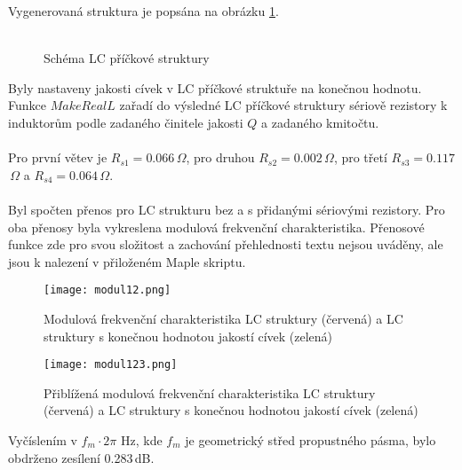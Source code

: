 \noindent Vygenerovaná struktura je popsána na obrázku \ref{s:SCHEM}.\\
\\
\begin{figure}[h]
\centering
{}
\caption{Schéma LC příčkové struktury \label{s:SCHEM}}
\end{figure}
\noindent Byly nastaveny jakosti cívek v LC příčkové struktuře na konečnou hodnotu. Funkce $MakeRealL$ zařadí do výsledné LC příčkové struktury sériově rezistory k induktorům podle zadaného činitele jakosti $Q$ a zadaného kmitočtu.\\
\\
Pro první větev je $R_{s1} = 0.066$\,$\Omega$, pro druhou $R_{s2} = 0.002$\,$\Omega$, pro třetí $R_{s3} = 0.117$\,$\Omega$ a $R_{s4} = 0.064$\,$\Omega$.\\
\\
\noindent Byl spočten přenos pro LC strukturu bez a s přidanými sériovými rezistory. Pro oba přenosy byla vykreslena modulová frekvenční charakteristika. Přenosové funkce zde pro svou složitost a zachování přehlednosti textu nejsou uváděny, ale jsou k nalezení v přiloženém Maple skriptu.
\begin{figure}[h]
\centering
\texttt{[image: modul12.png]}
\caption[Modulová frekvenční charakteristika LC struktury a LC struktury s konečnou hodnotou jakostí cívek]{Modulová frekvenční charakteristika LC struktury (červená) a LC struktury s konečnou hodnotou jakostí cívek (zelená)}
\end{figure}
\begin{figure}[h]
\centering
\texttt{[image: modul123.png]}
\caption[Přiblížená modulová frekvenční charakteristika LC struktury a LC struktury s konečnou hodnotou jakostí cívek]{Přiblížená modulová frekvenční charakteristika LC struktury (červená) a LC struktury s konečnou hodnotou jakostí cívek (zelená)}
\end{figure}
\noindent Vyčíslením v $f_m \cdot 2 \pi$ Hz, kde $f_m$ je geometrický střed propustného pásma, bylo obdrženo zesílení 0.283\,dB.\\
\\
